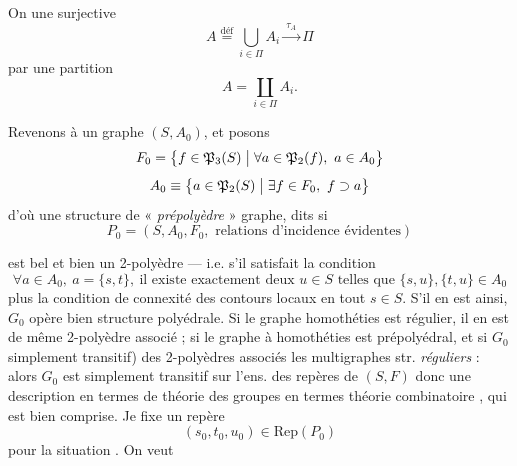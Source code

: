 \documentclass[11pt,a4paper]{article}
\begin{document}
On  \ill{} une  surjective
\[
A \overset{\text{déf}}{=} \bigcup_{i\in\Pi} A_i \xrightarrow{\ \tau_A\ } \Pi \tag{15}
\]
 par une partition
\[
A=\coprod_{i\in\Pi} A_i .
\]


 Revenons à un graphe  $(S,A_0)$, et posons
\[
F_0=\bigl\{f\in\mathfrak{P}_3(S) \bigm| \forall a\in\mathfrak{P}_2(f),\ a\in A_0\bigr\}
\]
\[
A_0 \equiv \bigl\{a\in\mathfrak{P}_2(S) \bigm| \exists f\in F_0,\ f\supset a\bigr\}
\]
d'où une structure de  « \emph{prépolyèdre} »  graphe, dits \struck{\ill{}} \ill{} si
\[
P_0=(S,A_0,F_0,\text{ relations d'incidence évidentes}) \tag{18}
\]

est bel et bien un 2-polyèdre — i.e. s'il satisfait la condition  
\[
\forall a\in A_0,\ a=\{s,t\},\ \text{il existe exactement deux } u\in S \text{ telles que } \{s,u\},\{t,u\}\in A_0 \tag{19}
\]
plus la condition de connexité des contours locaux en tout $s\in S$. S'il en est ainsi, $G_0$ opère bien   structure polyédrale. Si le graphe  homothéties est régulier, \struck{\ill{}} il en est de même  2-polyèdre associé \ill{};  \ill{} si le graphe à homothéties est prépolyédral, et si $G_0$ \ill{} simplement transitif)  \ill{} des 2-polyèdres associés \ill{} les multigraphes  \ill{} \ill{} str. \emph{réguliers} : alors $G_0$ est simplement transitif sur l'ens. des repères de $(S,F)$ donc une description \ill{} en termes de théorie des groupes \ill{} en termes \ill{} théorie combinatoire \ill{}  \ill{}, qui est bien comprise. Je \struck{\ill{}} fixe un repère \struck{\ill{}}
\[
(s_0,t_0,u_0)\in\mathrm{Rep}(P_0) \tag{20}
\]
pour  la situation .  On veut

\end{document}

